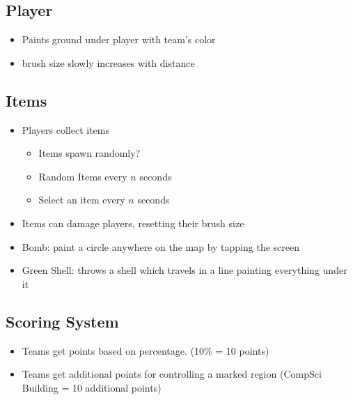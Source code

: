 \documentclass{article}
\begin{document}
\subsection{Player}
\begin{itemize}
\item Paints ground under player with team's color
\item brush size slowly increases with distance
\end{itemize}

\subsection{Items}
\begin{itemize}
\item Players collect items
	\begin{itemize}
	\item Items spawn randomly?
    \item Random Items every $n$ seconds
    \item Select an item every $n$ seconds
	\end{itemize}
\item Items can damage players, resetting their brush size
\item Bomb: paint a circle anywhere on the map by tapping the screen
\item Green Shell: throws a shell which travels in a line painting everything under it
\end{itemize}

\subsection{Scoring System}
\begin{itemize}
\item Teams get points based on percentage. (10\% = 10 points)
\item Teams get additional points for controlling a marked region (CompSci Building = 10 additional points)
\end{itemize}
\end{document}
